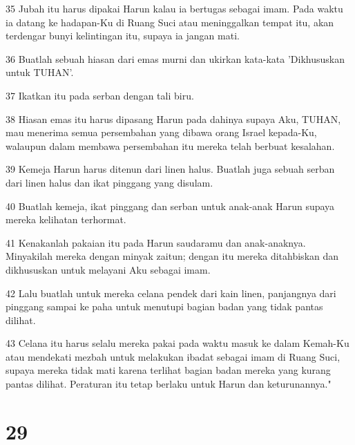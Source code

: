 \par 35 Jubah itu harus dipakai Harun kalau ia bertugas sebagai imam. Pada waktu ia datang ke hadapan-Ku di Ruang Suci atau meninggalkan tempat itu, akan terdengar bunyi kelintingan itu, supaya ia jangan mati.
\par 36 Buatlah sebuah hiasan dari emas murni dan ukirkan kata-kata 'Dikhususkan untuk TUHAN'.
\par 37 Ikatkan itu pada serban dengan tali biru.
\par 38 Hiasan emas itu harus dipasang Harun pada dahinya supaya Aku, TUHAN, mau menerima semua persembahan yang dibawa orang Israel kepada-Ku, walaupun dalam membawa persembahan itu mereka telah berbuat kesalahan.
\par 39 Kemeja Harun harus ditenun dari linen halus. Buatlah juga sebuah serban dari linen halus dan ikat pinggang yang disulam.
\par 40 Buatlah kemeja, ikat pinggang dan serban untuk anak-anak Harun supaya mereka kelihatan terhormat.
\par 41 Kenakanlah pakaian itu pada Harun saudaramu dan anak-anaknya. Minyakilah mereka dengan minyak zaitun; dengan itu mereka ditahbiskan dan dikhususkan untuk melayani Aku sebagai imam.
\par 42 Lalu buatlah untuk mereka celana pendek dari kain linen, panjangnya dari pinggang sampai ke paha untuk menutupi bagian badan yang tidak pantas dilihat.
\par 43 Celana itu harus selalu mereka pakai pada waktu masuk ke dalam Kemah-Ku atau mendekati mezbah untuk melakukan ibadat sebagai imam di Ruang Suci, supaya mereka tidak mati karena terlihat bagian badan mereka yang kurang pantas dilihat. Peraturan itu tetap berlaku untuk Harun dan keturunannya."

\chapter{29}

